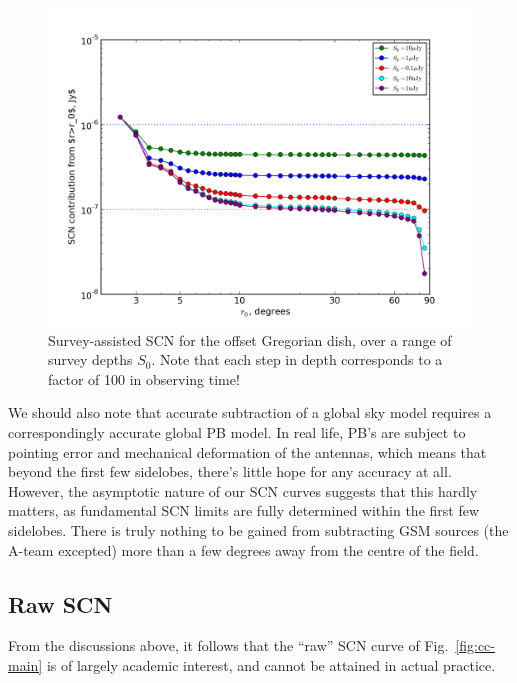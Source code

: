 \documentclass{aa}
\begin{document}
\begin{figure}
\includegraphics[width=\columnwidth]{costcurve-survey-multiple}
\caption{\label{fig:cc-survey-multi}Survey-assisted SCN for the offset Gregorian dish, over a range of survey depths $S_0$. Note that each step in depth corresponds to a factor of 100 in observing time!}
\end{figure}

We should also note that accurate subtraction of a global sky model requires a correspondingly accurate global PB model. In real life, PB's are subject to pointing error and mechanical deformation of the antennas, which means that beyond the first few sidelobes, there's little hope for any accuracy at all. However, the asymptotic nature of our SCN curves suggests that this hardly matters, as fundamental SCN limits are fully determined within the first few sidelobes. There is truly nothing to be gained from subtracting GSM sources (the A-team excepted) more than a few degrees away from the centre of the field.

\subsection{Raw SCN}

From the discussions above, it follows that the ``raw'' SCN curve of Fig.~\ref{fig:cc-main} is of largely academic interest, and cannot be attained in actual practice.
\end{document}
